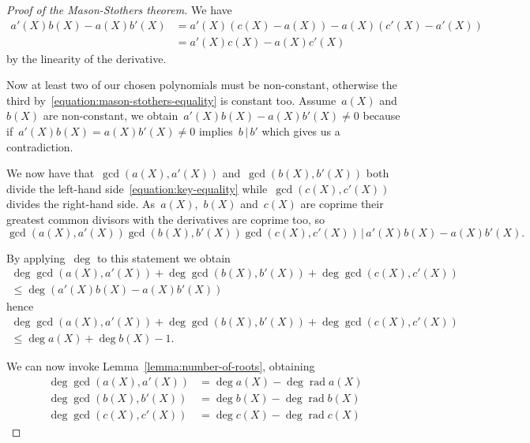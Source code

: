 \documentclass[11pt, a4paper, openany, oneside, article]{memoir}
\theoremstyle{definition}
\DeclareMathOperator\rad{rad}
\begin{document}
\begin{proof}[Proof of the Mason-Stothers theorem]
  We have
  \begin{equation}
    \label{equation:key-equality}
    \begin{aligned}
      a'(X)b(X)-a(X)b'(X)&=a'(X)\left( c(X)-a(X) \right)-a(X)\left( c'(X)-a'(X) \right) \\
      &=a'(X)c(X)-a(X)c'(X)
    \end{aligned}
  \end{equation}
  by the linearity of the derivative.

  Now at least two of our chosen polynomials must be non-constant, otherwise the third by~\eqref{equation:mason-stothers-equality} is constant too. Assume~$a(X)$ and~$b(X)$ are non-constant, we obtain~$a'(X)b(X)-a(X)b'(X)\neq 0$ because if~$a'(X)b(X)=a(X)b'(X)\neq 0$ implies~$b\,|\,b'$ which gives us a contradiction.

  We now have that~$\gcd(a(X),a'(X))$ and~$\gcd(b(X),b'(X))$ both divide the left-hand side~\eqref{equation:key-equality} while~$\gcd(c(X),c'(X))$ divides the right-hand side. As~$a(X)$,~$b(X)$ and~$c(X)$ are coprime their greatest common divisors with the derivatives are coprime too, so
  \begin{equation}
    \gcd\left( a(X),a'(X) \right)\gcd\left( b(X),b'(X) \right)\gcd\left( c(X),c'(X) \right)\,|\,a'(X)b(X)-a(X)b'(X).
  \end{equation}

  By applying~$\deg$ to this statement we obtain
  \begin{equation}
    \begin{gathered}
      \deg\gcd\left( a(X),a'(X) \right)+\deg\gcd\left( b(X),b'(X) \right)+\deg\gcd\left( c(X),c'(X) \right) \\
      \leq\deg\left( a'(X)b(X)-a(X)b'(X) \right)
    \end{gathered}
  \end{equation}
  hence
  \begin{equation}
    \label{equation:gcd-inequality}
    \begin{gathered}
      \deg\gcd\left( a(X),a'(X) \right)+\deg\gcd\left( b(X),b'(X) \right)+\deg\gcd\left( c(X),c'(X) \right) \\
      \leq\deg a(X)+\deg b(X)-1.
    \end{gathered}
  \end{equation}

  We can now invoke Lemma~\ref{lemma:number-of-roots}, obtaining
  \begin{equation}
    \begin{aligned}
      \deg\gcd\left( a(X),a'(X) \right)&=\deg a(X)-\deg\rad a(X) \\
      \deg\gcd\left( b(X),b'(X) \right)&=\deg b(X)-\deg\rad b(X) \\
      \deg\gcd\left( c(X),c'(X) \right)&=\deg c(X)-\deg\rad c(X)
    \end{aligned}
  \end{equation}


\end{proof}
\end{document}

